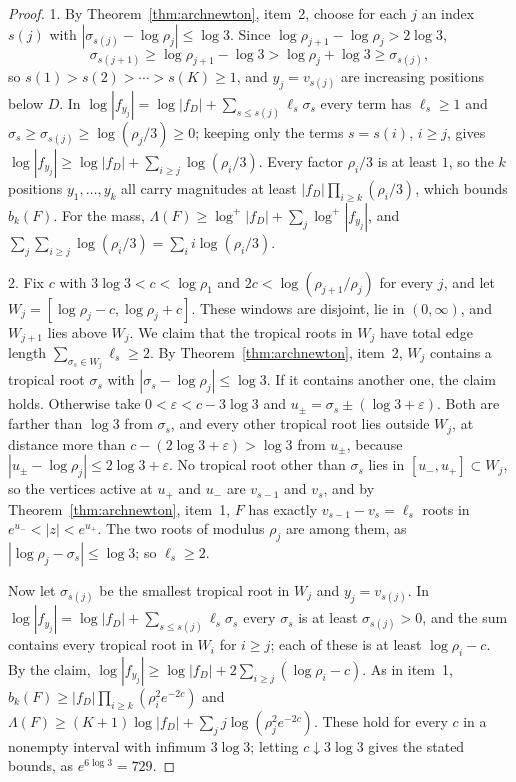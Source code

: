 \documentclass[11pt]{article}
\begin{document}
\begin{proof}
1.  By Theorem~\ref{thm:archnewton}, item~2, choose for each $j$ an index
$s(j)$ with $|\sigma_{s(j)}-\log\rho_j|\le\log3$.  Since
$\log\rho_{j+1}-\log\rho_j>2\log3$,
\[
  \sigma_{s(j+1)}\ge\log\rho_{j+1}-\log3>\log\rho_j+\log3\ge\sigma_{s(j)},
\]
so $s(1)>s(2)>\cdots>s(K)\ge1$, and $y_j=v_{s(j)}$ are increasing positions
below $D$.  In
$\log|f_{y_j}|=\log|f_D|+\sum_{s\le s(j)}\ell_s\sigma_s$ every term has
$\ell_s\ge1$ and $\sigma_s\ge\sigma_{s(j)}\ge\log(\rho_j/3)\ge0$; keeping only
the terms $s=s(i)$, $i\ge j$, gives
$\log|f_{y_j}|\ge\log|f_D|+\sum_{i\ge j}\log(\rho_i/3)$.  Every factor
$\rho_i/3$ is at least $1$, so the $k$ positions $y_1,\ldots,y_k$ all carry
magnitudes at least $|f_D|\prod_{i\ge k}(\rho_i/3)$, which bounds $b_k(F)$.
For the mass, $\Lambda(F)\ge\log^+|f_D|+\sum_j\log^+|f_{y_j}|$, and
$\sum_j\sum_{i\ge j}\log(\rho_i/3)=\sum_ii\log(\rho_i/3)$.

2.  Fix $c$ with $3\log3<c<\log\rho_1$ and $2c<\log(\rho_{j+1}/\rho_j)$ for
every $j$, and let $W_j=[\log\rho_j-c,\log\rho_j+c]$.  These windows are
disjoint, lie in $(0,\infty)$, and $W_{j+1}$ lies above $W_j$.  We claim that
the tropical roots in $W_j$ have total edge length
$\sum_{\sigma_s\in W_j}\ell_s\ge2$.  By Theorem~\ref{thm:archnewton}, item~2,
$W_j$ contains a tropical root $\sigma_s$ with $|\sigma_s-\log\rho_j|\le\log3$.
If it contains another one, the claim holds.  Otherwise take
$0<\varepsilon<c-3\log3$ and $u_\pm=\sigma_s\pm(\log3+\varepsilon)$.  Both are
farther than $\log3$ from $\sigma_s$, and every other tropical root lies
outside $W_j$, at distance more than $c-(2\log3+\varepsilon)>\log3$ from
$u_\pm$, because $|u_\pm-\log\rho_j|\le2\log3+\varepsilon$.  No tropical root
other than $\sigma_s$ lies in $[u_-,u_+]\subset W_j$, so the vertices active
at $u_+$ and $u_-$ are $v_{s-1}$ and $v_s$, and by
Theorem~\ref{thm:archnewton}, item~1, $F$ has exactly
$v_{s-1}-v_s=\ell_s$ roots in $e^{u_-}<|z|<e^{u_+}$.  The two roots of modulus
$\rho_j$ are among them, as $|\log\rho_j-\sigma_s|\le\log3$; so $\ell_s\ge2$.

Now let $\sigma_{s(j)}$ be the smallest tropical root in $W_j$ and
$y_j=v_{s(j)}$.  In $\log|f_{y_j}|=\log|f_D|+\sum_{s\le s(j)}\ell_s\sigma_s$
every $\sigma_s$ is at least $\sigma_{s(j)}>0$, and the sum contains every
tropical root in $W_i$ for $i\ge j$; each of these is at least
$\log\rho_i-c$.  By the claim,
$\log|f_{y_j}|\ge\log|f_D|+2\sum_{i\ge j}(\log\rho_i-c)$.  As in item~1,
$b_k(F)\ge|f_D|\prod_{i\ge k}(\rho_i^2e^{-2c})$ and
$\Lambda(F)\ge(K+1)\log|f_D|+\sum_jj\log(\rho_j^2e^{-2c})$.  These hold for
every $c$ in a nonempty interval with infimum $3\log3$; letting
$c\downarrow3\log3$ gives the stated bounds, as $e^{6\log3}=729$.

\end{proof}
\end{document}

